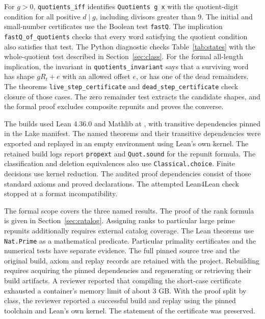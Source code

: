 \documentclass[11pt]{article}
\begin{document}
For \(g>0\), \texttt{quotients\_iff} identifies \texttt{Quotients g x}
with the quotient-digit condition for all positive \(d\mid g\),
including divisors greater than \(9\).
The initial and small-number certificates use the Boolean test
\texttt{fastQ}. The implication \texttt{fastQ\_of\_quotients} checks
that every word satisfying the quotient condition also satisfies that
test. The Python diagnostic  checks
Table~\ref{tab:states} with the whole-quotient test described in
Section~\ref{sec:class}.
For the formal all-length implication, the invariant in
\texttt{quotients\_invariant} says that a surviving word has shape
\(gR_t+e\) with an allowed offset \(e\), or has one of the dead
remainders. The theorems \texttt{live\_step\_certificate} and
\texttt{dead\_step\_certificate} check closure of those cases.
The zero remainder test extracts the candidate shapes, and the
formal proof excludes composite repunits and proves the converse.

The builds used Lean 4.36.0 \cite{lean} and Mathlib at
, with transitive
dependencies pinned in the Lake manifest. The named theorems and
their transitive dependencies were exported and replayed in an
empty environment using Lean's own kernel. The retained build logs
report \texttt{propext} and \texttt{Quot.sound} for the repunit formula.
The classification and deletion equivalences also use
\texttt{Classical.choice}. Finite decisions use kernel reduction.
The audited proof dependencies consist of those standard axioms and
proved declarations. The attempted Lean4Lean check stopped at a
format incompatibility.

The formal scope covers the three named results. The proof of the rank
formula is given in Section~\ref{sec:catalog}. Assigning ranks to
particular large prime repunits additionally requires external catalog
coverage. The Lean theorems use \texttt{Nat.Prime} as a mathematical
predicate. Particular primality certificates and the numerical tests
have separate evidence. The full pinned source tree and the original
build, axiom and replay records are retained with the project. Rebuilding
requires acquiring the pinned dependencies and regenerating or retrieving
their build artifacts. A reviewer reported that compiling the short-case
certificate exhausted a container's memory limit of about \(3\) GB.
With the proof split by class, the reviewer reported a successful build
and replay using the pinned toolchain and Lean's own kernel. The statement
of the certificate was preserved.
\end{document}
